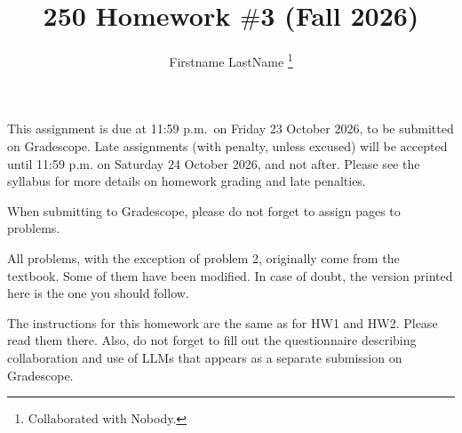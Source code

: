 \documentclass[12pt]{article}
\title{250 Homework $\#$3 (Fall  2026)}
\author{Firstname LastName \footnote{Collaborated with Nobody.}}
\begin{document}
\date{}
\maketitle


 This assignment is due at 11:59 p.m.~on Friday 23  October 2026, to 
be submitted on Gradescope.  Late assignments (with penalty, unless
excused) will be accepted until
11:59 p.m. on Saturday 24 October  2026, and not after.  Please see
the syllabus for more details on homework grading and late penalties.

\medskip

When submitting to Gradescope, please do not forget to assign pages to problems.

\medskip


All problems, with the exception of problem 2, originally come from the textbook. Some of them have been modified.  In case of doubt, the version printed here is the one you should follow.

\bigskip


The instructions for this homework are the same as for HW1 and HW2.  Please read them there.
Also, do not forget to fill out the questionnaire describing collaboration and use of LLMs that appears as a separate submission on Gradescope.








\end{document}
